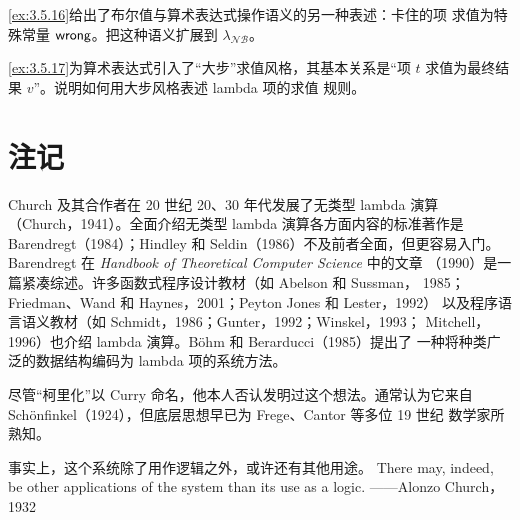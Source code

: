 \begin{exercise}[\(\star\star,\nrightarrow\)]
\label{ex:5.3.7}
\cref{ex:3.5.16}给出了布尔值与算术表达式操作语义的另一种表述：卡住的项
求值为特殊常量 \(\mathsf{wrong}\)。把这种语义扩展到
\(\lambda_{\mathcal{NB}}\)。
\end{exercise}

\begin{exercise}[\(\star\star\)]
\label{ex:5.3.8}
\cref{ex:3.5.17}为算术表达式引入了“大步”求值风格，其基本关系是“项
\(t\) 求值为最终结果 \(v\)”。说明如何用大步风格表述 lambda 项的求值
规则。
\end{exercise}

\section{注记}
\label{sec:5.4}

Church 及其合作者在 20 世纪 20、30 年代发展了无类型 lambda 演算
（Church，1941）。全面介绍无类型 lambda 演算各方面内容的标准著作是
Barendregt（1984）；Hindley 和 Seldin（1986）不及前者全面，但更容易入门。
Barendregt 在 \emph{Handbook of Theoretical Computer Science} 中的文章
（1990）是一篇紧凑综述。许多函数式程序设计教材（如 Abelson 和 Sussman，
1985；Friedman、Wand 和 Haynes，2001；Peyton Jones 和 Lester，1992）
以及程序语言语义教材（如 Schmidt，1986；Gunter，1992；Winskel，1993；
Mitchell，1996）也介绍 lambda 演算。Böhm 和 Berarducci（1985）提出了
一种将种类广泛的数据结构编码为 lambda 项的系统方法。

尽管“柯里化”以 Curry 命名，他本人否认发明过这个想法。通常认为它来自
Schönfinkel（1924），但底层思想早已为 Frege、Cantor 等多位 19 世纪
数学家所熟知。

\bilingualepigraph
  {事实上，这个系统除了用作逻辑之外，或许还有其他用途。}
  {There may, indeed, be other applications of the system than its use as a
  logic.}
  {——Alonzo Church，1932}
